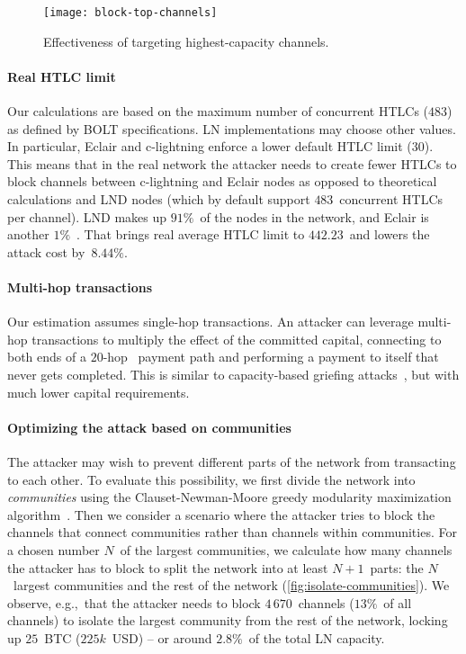 \begin{figure}[tb]
	\centering
	\texttt{[image: block-top-channels]}
	\caption{Effectiveness of targeting highest-capacity channels.}
	\label{fig:block-top-channels}
\end{figure}

\paragraph{Real HTLC limit}
Our calculations are based on the maximum number of concurrent HTLCs ($483$) as defined by BOLT specifications.
LN implementations may choose other values.
In particular, Eclair and c-lightning enforce a lower default HTLC limit ($30$).
This means that in the real network the attacker needs to create fewer HTLCs to block channels between c-lightning and Eclair nodes as opposed to theoretical calculations and LND nodes (which by default support $483$~concurrent HTLCs per channel).
LND makes up $91\%$~of the nodes in the network, and Eclair is another $1\%$~\cite{Mizrahi2020}.
That brings real average HTLC limit to $442.23$~and lowers the attack cost by~$8.44\%$.

\paragraph{Multi-hop transactions}
Our estimation assumes single-hop transactions.
An attacker can leverage multi-hop transactions to multiply the effect of the committed capital, connecting to both ends of a $20$-hop~\cite{Bolt4OnionRouting} payment path and performing a payment to itself that never gets completed.
This is similar to capacity-based griefing attacks~\cite{HerreraJoancomarti2019}, but with much lower capital requirements.

\paragraph{Optimizing the attack based on communities}
The attacker may wish to prevent different parts of the network from transacting to each other.
To evaluate this possibility, we first divide the network into \textit{communities} using the Clauset-Newman-Moore greedy modularity maximization algorithm~\cite{Clauset2004}.
Then we consider a scenario where the attacker tries to block the channels that connect communities rather than channels within communities.
For a chosen number $N$~of the largest communities, we calculate how many channels the attacker has to block to split the network into at least $N+1$~parts: the $N$~largest communities and the rest of the network (\cref{fig:isolate-communities}).
We observe, e.g.,~that the attacker needs to block $4\,670$~channels ($13\%$~of all channels) to isolate the largest community from the rest of the network, locking up $25$~BTC ($225k$~USD) -- or around $2.8\%$~of the total LN capacity.

